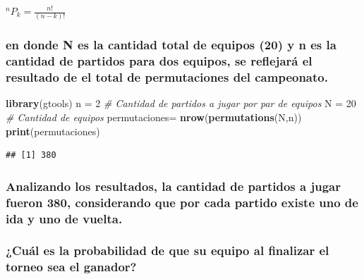 \documentclass[]{article}
\newenvironment{Shaded}{\begin{snugshade}}{\end{snugshade}}
\newcommand{\CommentTok}[1]{\textcolor[rgb]{0.56,0.35,0.01}{\textit{#1}}}
\newcommand{\DecValTok}[1]{\textcolor[rgb]{0.00,0.00,0.81}{#1}}
\newcommand{\KeywordTok}[1]{\textcolor[rgb]{0.13,0.29,0.53}{\textbf{#1}}}
\newcommand{\NormalTok}[1]{#1}
\newcommand{\StringTok}[1]{\textcolor[rgb]{0.31,0.60,0.02}{#1}}
\begin{document}
\newcommand*{\Perm}[2]{{}^{#1}\!P_{#2}}

\({}^{n}\!P_{k}=\frac{n!}{(n-k)!}\)

\hypertarget{en-donde-n-es-la-cantidad-total-de-equipos-20-y-n-es-la-cantidad-de-partidos-para-dos-equipos-se-reflejara-el-resultado-de-el-total-de-permutaciones-del-campeonato.}{%
\subsubsection{en donde N es la cantidad total de equipos (20) y n es la
cantidad de partidos para dos equipos, se reflejará el resultado de el
total de permutaciones del
campeonato.}\label{en-donde-n-es-la-cantidad-total-de-equipos-20-y-n-es-la-cantidad-de-partidos-para-dos-equipos-se-reflejara-el-resultado-de-el-total-de-permutaciones-del-campeonato.}}

\begin{Shaded}
\begin{Highlighting}[]
\KeywordTok{library}\NormalTok{(gtools)}
\NormalTok{n =}\StringTok{ }\DecValTok{2} \CommentTok{# Cantidad de partidos a jugar por par de equipos}
\NormalTok{N =}\StringTok{ }\DecValTok{20} \CommentTok{# Cantidad de equipos}
\NormalTok{permutaciones=}\StringTok{ }\KeywordTok{nrow}\NormalTok{(}\KeywordTok{permutations}\NormalTok{(N,n))}
\KeywordTok{print}\NormalTok{(permutaciones)}
\end{Highlighting}
\end{Shaded}

\begin{verbatim}
## [1] 380
\end{verbatim}

\hypertarget{analizando-los-resultados-la-cantidad-de-partidos-a-jugar-fueron-380-considerando-que-por-cada-partido-existe-uno-de-ida-y-uno-de-vuelta.}{%
\subsubsection{Analizando los resultados, la cantidad de partidos a
jugar fueron 380, considerando que por cada partido existe uno de ida y
uno de
vuelta.}\label{analizando-los-resultados-la-cantidad-de-partidos-a-jugar-fueron-380-considerando-que-por-cada-partido-existe-uno-de-ida-y-uno-de-vuelta.}}

\hypertarget{cual-es-la-probabilidad-de-que-su-equipo-al-finalizar-el-torneo-sea-el-ganador}{%
\subsubsection{¿Cuál es la probabilidad de que su equipo al finalizar el
torneo sea el
ganador?}\label{cual-es-la-probabilidad-de-que-su-equipo-al-finalizar-el-torneo-sea-el-ganador}}
\end{document}
